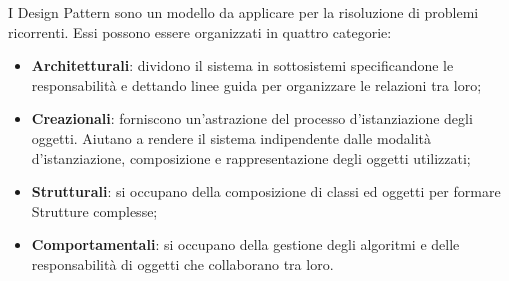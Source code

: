 I \gls{Design Pattern} sono un modello da applicare per la risoluzione di problemi ricorrenti. Essi possono essere organizzati in quattro categorie:
\begin{itemize}
	\item \textbf{Architetturali}: dividono il sistema in sottosistemi specificandone le responsabilità e dettando linee guida per organizzare le relazioni tra loro;
	\item \textbf{Creazionali}: forniscono un'astrazione del processo d'istanziazione degli oggetti. Aiutano a rendere il sistema indipendente dalle modalità d'istanziazione, composizione e rappresentazione degli oggetti utilizzati;
	\item \textbf{Strutturali}: si occupano della composizione di classi ed oggetti per formare Strutture complesse;
	\item \textbf{Comportamentali}: si occupano della gestione degli algoritmi e delle responsabilità di oggetti che collaborano tra loro.
\end{itemize}

\newpage

